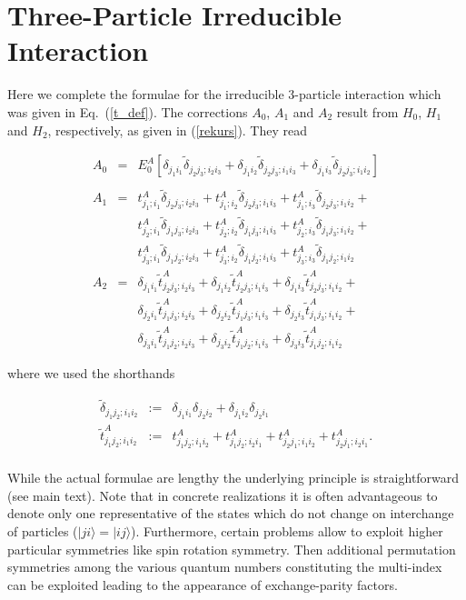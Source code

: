 \section{Three-Particle Irreducible Interaction}
\label{3part}
Here we complete the formulae for the irreducible 3-particle interaction
which was given in Eq.~(\ref{t_def}). The corrections $A_0$, $A_1$ and $A_2$
result from $H_0$, $H_1$ and $H_2$, respectively, as given in (\ref{rekurs}).
They read
\begin{mathletters}
\begin{eqnarray}
A_0 \!&=& E_0^A[\delta_{j_1i_1}\tilde\delta_{j_2j_3;i_2i_3}+ 
\delta_{j_1i_2}\tilde\delta_{j_2j_3;i_1i_3}+
\delta_{j_1i_3}\tilde\delta_{j_2j_3;i_1i_2}]\nonumber\\
&&\\
A_1 \!&=& t^A_{j_1;i_1}\tilde\delta_{j_2j_3;i_2i_3} +
 t^A_{j_1;i_2}\tilde\delta_{j_2j_3;i_1i_3} + 
t^A_{j_1;i_3}\tilde\delta_{j_2j_3;i_1i_2} + \nonumber\\
&&
 t^A_{j_2;i_1}\tilde\delta_{j_1j_3;i_2i_3} +
t^A_{j_2;i_2}\tilde\delta_{j_1j_3;i_1i_3}+ 
t^A_{j_2;i_3}\tilde\delta_{j_1j_3;i_1i_2}+\nonumber\\
&& t^A_{j_3;i_1}\tilde\delta_{j_1j_2;i_2i_3} + 
 t^A_{j_3;i_2}\tilde\delta_{j_1j_2;i_1i_3} +
t^A_{j_3;i_3}\tilde\delta_{j_1j_2;i_1i_2}
\\
A_2 \!&=& \delta_{j_1i_1}\tilde t^A_{j_2j_3;i_2i_3} +
 \delta_{j_1i_2}\tilde t^A_{j_2j_3;i_1i_3} + 
\delta_{j_1i_3}\tilde t^A_{j_2j_3;i_1i_2} + \nonumber\\
&&
 \delta_{j_2i_1}\tilde t^A_{j_1j_3;i_2i_3} +
\delta_{j_2i_2}\tilde t^A_{j_1j_3;i_1i_3}+ 
\delta_{j_2i_3}\tilde t^A_{j_1j_3;i_1i_2}+\nonumber\\
&& \delta_{j_3i_1}\tilde t^A_{j_1j_2;i_2i_3} + 
 \delta_{j_3i_2}\tilde t^A_{j_1j_2;i_1i_3} +
\delta_{j_3i_3}\tilde t^A_{j_1j_2;i_1i_2}
\end{eqnarray}
\end{mathletters}
where we used the shorthands
\begin{mathletters}
\begin{eqnarray}
\tilde\delta_{j_1j_2;i_1i_2} &:=&\delta_{j_1i_1}\delta_{j_2i_2}+ 
\delta_{j_1i_2}\delta_{j_2i_1}\\
\tilde t^A_{j_1j_2;i_1i_2} &:=&
 t^A_{j_1j_2;i_1i_2}+ t^A_{j_1j_2;i_2i_1} + t^A_{j_2j_1;i_1i_2}
+ t^A_{j_2j_1;i_2i_1}.\nonumber\\ &&
\end{eqnarray}
\end{mathletters}
While the actual formulae are lengthy the underlying principle
is straightforward (see main text). Note that in concrete
realizations it is often advantageous to denote only one 
representative of the states which do not change on interchange
of particles ($|ji\rangle = |ij\rangle$).
Furthermore, certain problems allow to exploit higher particular 
symmetries like spin rotation symmetry. Then additional permutation
symmetries among the various quantum numbers constituting the 
multi-index can be exploited leading to the appearance of exchange-parity
factors.

